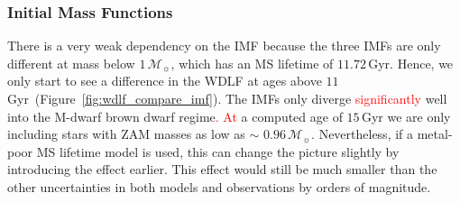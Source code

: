 \documentclass[fleqn,usenatbib]{rasti}
\newcommand{\msun}{\mathcal{M}_{\sun}}
\begin{document}
\subsubsection{Initial Mass Functions}
There is a very weak dependency on the IMF because the three IMFs are only
different at mass below $1\,\msun$, which has an MS lifetime of $11.72$\,Gyr.
Hence, we only start to see a difference in the WDLF at ages above
$11$\,Gyr~(Figure~\ref{fig:wdlf_compare_imf}). The IMFs only diverge \textcolor{red}{significantly}
well into the M-dwarf brown dwarf regime\textcolor{red}{. At} a computed age of $15$\,Gyr
we are only including stars with ZAM masses as low as $\sim$ $0.96\,\msun$.
Nevertheless, if a metal-poor MS lifetime model is used, this can change the
picture slightly by introducing the effect earlier. This effect would still
be much smaller than the other uncertainties in both models and observations
by orders of magnitude.
\end{document}
